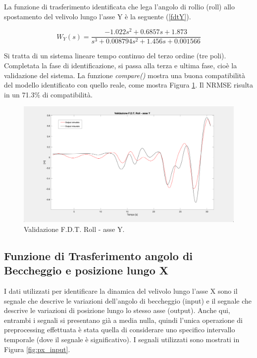 La funzione di trasferimento identificata che lega l'angolo di rollio (roll) allo spostamento del velivolo lungo l'asse Y è la seguente (\ref{fdtY}).

\begin{equation}
	W_Y(s) = \frac{-1.022s^2 + 0.6857s + 1.873}{s^3 + 0.008794s^2 + 1.456s + 0.001566}
	\label{fdtY}
\end{equation}

Si tratta di un sistema lineare tempo continuo del terzo ordine (tre poli).\\

Completata la fase di identificazione, si passa alla terza e ultima fase, cioè la validazione del sistema. La funzione \emph{compare()} \cite{compare} mostra una buona compatibilità del modello identificato con quello reale, come mostra Figura \ref{fig:ry_model}. Il \acs{NRMSE} risulta in un 71.3\% di compatibilità.

\begin{figure}[H]
	\centering
	\includegraphics[width=1\textwidth]{gfx/SysId/ry_model}
	\caption[Validazione F.D.T. Roll - asse Y.]{Validazione F.D.T. Roll - asse Y.}
	\label{fig:ry_model}
\end{figure}

\subsection{Funzione di Trasferimento angolo di Beccheggio e posizione lungo X}
I dati utilizzati per identificare la dinamica del velivolo lungo l'asse X sono il segnale che descrive le variazioni dell'angolo di beccheggio (input) e il segnale che descrive le variazioni di posizione lungo lo stesso asse (output). Anche qui, entrambi i segnali si presentano già a media nulla, quindi l'unica operazione di preprocessing effettuata è stata quella di considerare uno specifico intervallo temporale (dove il segnale è significativo). I segnali utilizzati sono mostrati in Figura \ref{fig:px_input}.

